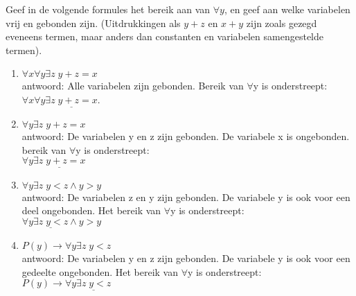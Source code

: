 \begin{answer} %
Geef in de volgende formules het bereik aan van $\forall y$, en geef aan welke variabelen vrij en gebonden zijn. (Uitdrukkingen als $y+z$ en $x+y$ zijn zoals gezegd eveneens termen, maar anders dan constanten en variabelen samengestelde termen).
\begin{enumerate}[label=\roman*.]
    \item $\forall x\forall y\exists z\;y+z=x$ \\
    antwoord:  Alle variabelen zijn gebonden. Bereik van $\forall$y is onderstreept: \\
    $\forall x\forall y \underline{\exists z\;y+z=x}$.
    \item $\forall y\exists z\;y+z=x$ \\ 
    antwoord: De variabelen y en z zijn gebonden. De variabele x is ongebonden. bereik van $\forall$y is onderstreept: \\
    $\forall y \underline{\exists z\;y+z=x}$
    \item $\forall y\exists z\;y<z\wedge y>y$\\
    antwoord: De variabelen z en y zijn gebonden. De variabele y is ook voor een deel ongebonden. Het bereik van $\forall$y is onderstreept: \\
    $\forall y \underline{\exists z\;y<z}\wedge y>y$
    \item $P(y)\rightarrow\forall y\exists z\;y<z$ \\ 
    antwoord: De variabelen y en z zijn gebonden. De variabele y is ook voor een gedeelte ongebonden. Het bereik van $\forall$y is onderstreept: \\
    $P(y)\rightarrow\forall y \underline{\exists z\;y<z}$
\end{enumerate}
\end{answer}

